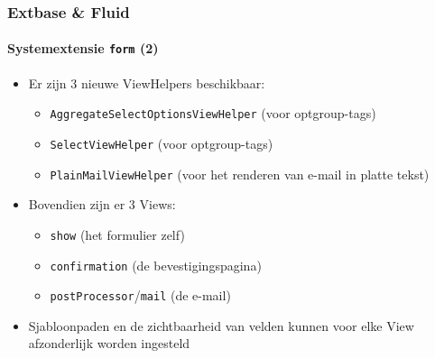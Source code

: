 \begin{frame}[fragile]
	\frametitle{Extbase \& Fluid}
	\framesubtitle{Systemextensie \texttt{form} (2)}

	\begin{itemize}

		\item Er zijn 3 nieuwe ViewHelpers beschikbaar:

			\begin{itemize}
				\item \texttt{AggregateSelectOptionsViewHelper} (voor optgroup-tags)
				\item \texttt{SelectViewHelper} (voor optgroup-tags)
				\item \texttt{PlainMailViewHelper} (voor het renderen van e-mail in platte tekst)
			\end{itemize}

		\item Bovendien zijn er 3 Views:

			\begin{itemize}
				\item \texttt{show} (het formulier zelf)
				\item \texttt{confirmation} (de bevestigingspagina)
				\item \texttt{postProcessor}/\texttt{mail} (de e-mail)
			\end{itemize}

		\item Sjabloonpaden en de zichtbaarheid van velden kunnen voor elke View afzonderlijk 
			worden ingesteld

	\end{itemize}

\end{frame}


